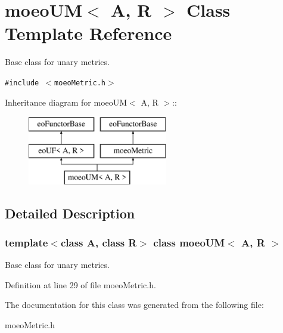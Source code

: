 \section{moeo\-UM$<$ A, R $>$ Class Template Reference}
\label{classmoeoUM}
Base class for unary metrics.  


{\tt \#include $<$moeo\-Metric.h$>$}

Inheritance diagram for moeo\-UM$<$ A, R $>$::\begin{figure}[H]
\begin{center}
\leavevmode
\includegraphics[height=3cm]{classmoeoUM}
\end{center}
\end{figure}


\subsection{Detailed Description}
\subsubsection*{template$<$class A, class R$>$ class moeo\-UM$<$ A, R $>$}

Base class for unary metrics. 



Definition at line 29 of file moeo\-Metric.h.

The documentation for this class was generated from the following file:\begin{CompactItemize}
\item 
moeo\-Metric.h\end{CompactItemize}
